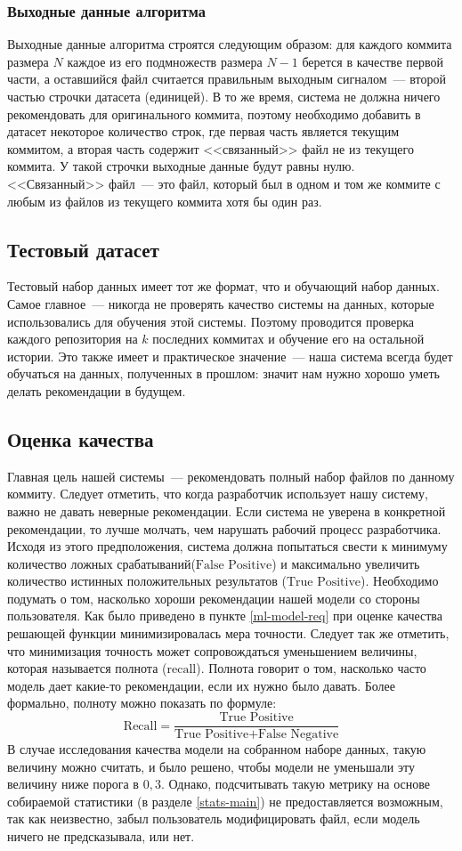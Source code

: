    \subsubsection{Выходные данные алгоритма}\label{related-files-intro}
 Выходные данные алгоритма строятся следующим образом: для каждого коммита размера $N$ каждое из его подмножеств размера $N - 1$ берется в качестве первой части, а оставшийся файл считается правильным выходным сигналом~--- второй частью строчки датасета (единицей). В то же время, система не должна ничего рекомендовать для оригинального коммита, поэтому необходимо добавить в датасет некоторое количество строк, где первая часть является текущим коммитом, а вторая часть содержит <<связанный>> файл не из текущего коммита. У такой строчки выходные данные будут равны нулю. <<Связанный>> файл~--- это файл, который был в одном и том же коммите с любым из файлов из текущего коммита хотя бы один раз.
    \subsection{Тестовый датасет}
Тестовый набор данных имеет тот же формат, что и обучающий набор данных. Самое главное~--- никогда не проверять качество системы на данных, которые использовались для обучения этой системы. Поэтому проводится проверка каждого репозитория на $k$ последних коммитах и обучение его на остальной истории. Это также имеет и практическое значение~--- наша система всегда будет обучаться на данных, полученных в прошлом: значит нам нужно хорошо уметь делать рекомендации в будущем.
    \subsection{Оценка качества}\label{measure}
Главная цель нашей системы~--- рекомендовать полный набор файлов по данному коммиту. Следует отметить, что когда разработчик использует нашу систему, важно не давать неверные рекомендации. Если система не уверена в конкретной рекомендации, то лучше молчать, чем нарушать рабочий процесс разработчика. Исходя из этого предположения, система должна попытаться свести к минимуму количество ложных срабатываний($\text{False Positive}$) и максимально увеличить количество истинных положительных результатов ($\text{True Positive}$). Необходимо подумать о том, насколько хороши рекомендации нашей модели со стороны пользователя. Как было приведено в пункте \ref{ml-model-req} при оценке качества решающей функции минимизировалась мера точности. Следует так же отметить, что минимизация точность может сопровождаться уменьшением величины, которая называется полнота ($\text{recall}$). Полнота говорит о том, насколько часто модель дает какие-то рекомендации, если их нужно было давать. Более формально, полноту можно показать по формуле:
    $$\text{Recall} = \frac{\text{True Positive}}{\text{True Positive} + \text{False Negative}} $$
В случае исследования качества модели на собранном наборе данных, такую величину можно считать, и было решено, чтобы модели не уменьшали эту величину ниже порога в $0,3$. Однако, подсчитывать такую метрику на основе собираемой статистики (в разделе \ref{stats-main}) не предоставляется возможным, так как неизвестно, забыл пользователь модифицировать файл, если модель ничего не предсказывала, или нет.

